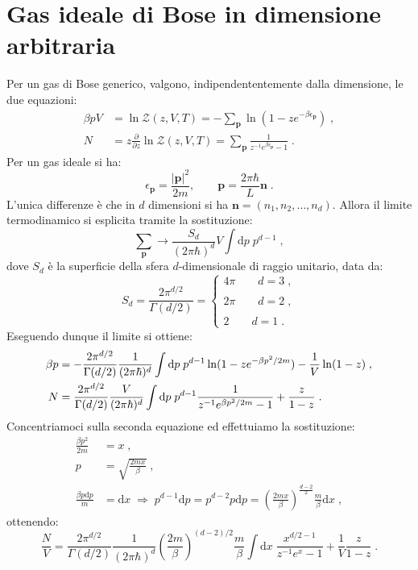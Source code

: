 \documentclass[10pt,a4paper]{report}
\theoremstyle{definition}
\numberwithin{equation}{section}
\newcommand{\diff}[1][]{\mathrm{d}#1}
\newcommand{\zpart}{\mathcal{Z}}
\begin{document}
\section{Gas ideale di Bose in dimensione arbitraria}
Per un gas di Bose generico, valgono, indipendententemente dalla dimensione, le due equazioni:
\begin{align*}
\beta pV&=\ln\zpart(z,V,T)=-\sum_{\mathbf{p}}\ln(1-ze^{-\beta \epsilon_{\mathbf{p}}})\;, \\
N&=z\frac{\partial}{\partial z}\ln\zpart(z,V,T)=\sum_{\mathbf{p}}\frac{1}{z^{-1}e^{\beta\epsilon_{\mathbf{p}}}-1}\;.
\end{align*}
Per un gas ideale si ha:
$$
\epsilon_{\mathbf{p}}=\frac{|\mathbf{p}|^2}{2m},\qquad \mathbf{p}=\frac{2\pi\hbar}{L}\mathbf{n}\;.
$$
L'unica differenze è che in $d$ dimensioni si ha $\mathbf{n}=(n_1,n_2,\ldots,n_d)$. Allora il limite termodinamico si esplicita tramite la sostituzione:
$$
\sum_{\mathbf{p}} \longrightarrow \frac{S_d}{(2\pi\hbar)^d}V\int\diff{p}\;p^{d-1}\;,
$$
dove $S_d$ è la superficie della sfera $d$-dimensionale di raggio unitario, data da:
\begin{equation}
S_d=\frac{2\pi^{d/2}}{\Gamma(d/2)}=\begin{cases}
4\pi\qquad d=3\;, \\
\\
2\pi \qquad d=2\;, \\
\\
2\qquad d=1\;.
\end{cases}
\end{equation}
Eseguendo dunque il limite si ottiene:
\begin{align}
\beta p &=-\frac{2\pi^{d/2}}{\Gamma(d/2)}\frac{1}{(2\pi\hbar)^d}\int\diff{p}\;p^{d-1}\ln(1-ze^{-\beta p^2/2m})-\frac{1}{V}\ln(1-z)\;, \notag \\
N &= \frac{2\pi^{d/2}}{\Gamma(d/2)}\frac{V}{(2\pi\hbar)^d}\int\diff{p}\;p^{d-1}\frac{1}{z^{-1}e^{\beta p^2/2m}-1}+\frac{z}{1-z}\;.
\end{align}
Concentriamoci sulla seconda equazione ed effettuiamo la sostituzione:
\begin{align*}
\frac{\beta p^2}{2m}&= x\;, \\
p&=\sqrt{\frac{2mx}{\beta}}\;, \\
\frac{\beta p\diff{p}}{m}&=\diff{x}\; \Longrightarrow\; p^{d-1}\diff{p}=p^{d-2}p\diff{p}=\left(\frac{2mx}{\beta}\right)^{\frac{d-2}{2}}\frac{m}{\beta}\diff{x}\;,
\end{align*}
ottenendo:
$$
\frac{N}{V}=\frac{2\pi^{d/2}}{\Gamma(d/2)}\frac{1}{(2\pi\hbar)^d}\left(\frac{2m}{\beta}\right)^{(d-2)/2}\frac{m}{\beta}\int\diff{x}\;\frac{x^{d/2-1}}{z^{-1}e^x-1}+\frac{1}{V}\frac{z}{1-z}\;.
$$
\end{document}
